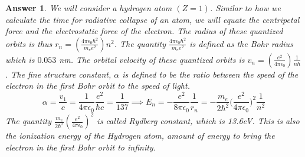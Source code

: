 \documentclass[a4paper]{article}
\newtheorem{ans}{Answer}[subsection]
\theoremstyle{new}
\begin{document}
\begin{ans}
We will consider a hydrogen atom $(Z=1)$. Similar to how we calculate the time for radiative collapse of an atom, we will equate the centripetal force and the electrostatic force of the electron. The radius of these quantized orbits is thus  $r_n=(\frac{4\pi\epsilon_0\hbar^2}{m_ee^2})n^2$. 
The quantity $\frac{4\pi\epsilon_0\hbar^2}{m_ee^2}$ is defined as the Bohr radius which is $0.053$ nm. The orbital velocity of these quantized orbits is $
v_n=(\frac{e^2}{4\pi\epsilon_0})\frac{1}{n\hbar}$. 
The fine structure constant, $\alpha$ is defined to be the ratio between the speed of the electron in the first Bohr orbit to the speed of light.
$$\alpha=\frac{v_1}{c}=\frac{1}{4\pi\epsilon_0}\frac{e^2}{\hbar c}=\frac{1}{137}\implies E_n=-\frac{e^2}{8\pi\epsilon_0}\frac{1}{r_n}=-\frac{m_e}{2\hbar^2}\bigg(\frac{e^2}{4\pi\epsilon_0}\bigg)^2\frac{1}{n^2}$$
The quantity $\frac{m_e}{2\hbar^2}(\frac{e^2}{4\pi\epsilon_0})^2$ is called Rydberg constant, which is 13.6eV. This is also the ionization energy of the Hydrogen atom, amount of energy to bring the electron in the first Bohr orbit to infinity. 

\end{ans}
\end{document}
